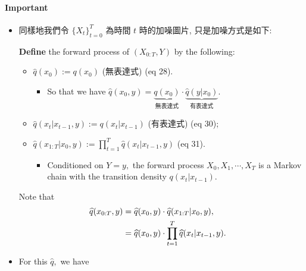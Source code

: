 \documentclass[
]{article}
\let\oldparagraph\paragraph
\renewcommand{\paragraph}[1]{\oldparagraph{#1}\mbox{}}
\providecommand{\tightlist}{%
  \setlength{\itemsep}{0pt}\setlength{\parskip}{0pt}}\usepackage{longtable,booktabs,array}
\theoremstyle{remark}
\begin{document}
\paragraph{Important}\label{important}

\begin{itemize}
\item
  同樣地我們令 \(\lbrace X_t \rbrace_{t=0}^T\) 為時間 \(t\)
  時的加噪圖片, 只是加噪方式是如下:

  \textbf{Define} the forward process of \((X_{0:T},Y)\) by the
  following:

  \begin{itemize}
  \tightlist
  \item
    \(\widehat{q}(x_0):= q(x_0)\) (無表達式) (eq 28).

    \begin{itemize}
    \tightlist
    \item
      So that we have
      \(\widehat{q}(x_0,y)=\underbrace{q(x_0)}_{\text{無表達式}} \cdot \underbrace{\widehat{q}(y\vert x_0)}_{\text{有表達式}}.\)
    \end{itemize}
  \item
    \(\widehat{q}(x_t\vert x_{t-1},y):= q(x_{t}\vert x_{t-1})\)
    (有表達式) (eq 30);
  \item
    \(\widehat{q}(x_{1:T}\vert x_0,y):= \prod_{t=1}^T \widehat{q}(x_t\vert x_{t-1},y)\)
    (eq 31).

    \begin{itemize}
    \tightlist
    \item
      Conditioned on \(Y=y,\) the forward process \(X_0,X_1,\cdots,X_T\)
      is a Markov chain with the transition density
      \(q(x_t\vert x_{t-1}).\)
    \end{itemize}
  \end{itemize}

  Note that \[
  \begin{aligned}
    \widehat{q}(x_{0:T},y)
    &= \widehat{q}(x_0,y) \cdot \widehat{q}(x_{1:T}\vert x_0,y), \cr 
    &= \widehat{q}(x_0,y) \cdot \prod_{t=1}^T \widehat{q}(x_t\vert x_{t-1},y).
  \end{aligned}
  \]
\item
  For this \(\widehat{q},\) we have


\end{itemize}
\end{document}
